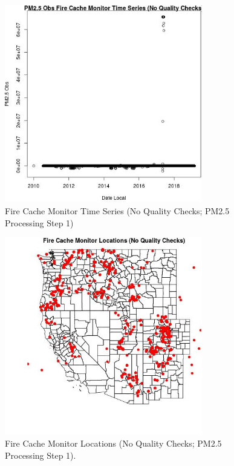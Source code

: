 
\begin{figure} 
\centering  
\includegraphics[width=0.77\textwidth]{Code_Outputs/PM25Source2TSstep1_PM25_ObsvDate_Local.jpg} 
\caption{\label{fig:PM25Source2TSstep1PM25_ObsvDate_Local}Fire Cache Monitor Time Series (No Quality Checks; PM2.5 Processing Step 1)} 
\end{figure} 
 

\begin{figure} 
\centering  
\includegraphics[width=0.77\textwidth]{Code_Outputs/PM25Source2TSstep1_MapFireCacheLocations.jpg} 
\caption{\label{fig:PM25Source2TSstep1MapFireCacheLocations}Fire Cache Monitor Locations (No Quality Checks; PM2.5 Processing Step 1).} 
\end{figure} 
 
